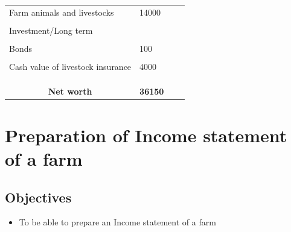 \documentclass[
]{article}
\providecommand{\tightlist}{%
  \setlength{\itemsep}{0pt}\setlength{\parskip}{0pt}}
\begin{document}
\begin{minipage}[c]{\textwidth}
{\begin{minipage}{0.7\textwidth}
\begin{table}[H]
\begin{tabular}[t]{llll}
Farm animals and livestocks & 14000 &  & \\
\cellcolor{gray!6}{Non-current/Fixed total} & \cellcolor{gray!6}{183500} & \cellcolor{gray!6}{Long term total} & \cellcolor{gray!6}{122400}\\
\addlinespace
Investment/Long term &  &  \vphantom{1}& \\
\cellcolor{gray!6}{Stocks} & \cellcolor{gray!6}{1000} & \cellcolor{gray!6}{} & \cellcolor{gray!6}{}\\
Bonds & 100 &  & \\
\cellcolor{gray!6}{Goodwill} & \cellcolor{gray!6}{5000} & \cellcolor{gray!6}{} & \cellcolor{gray!6}{}\\
Cash value of livestock insurance & 4000 &  & \\
\addlinespace
\cellcolor{gray!6}{Investment/Long term total} & \cellcolor{gray!6}{10100} & \cellcolor{gray!6}{} & \cellcolor{gray!6}{}\\
 &  &  & \\
\cellcolor{gray!6}{Total assets} & \cellcolor{gray!6}{216550} & \cellcolor{gray!6}{Total liabilities} & \cellcolor{gray!6}{180400}\\
\multicolumn{1}{c}{\textbf{Net worth}} & \multicolumn{1}{c}{\textbf{36150}} & \multicolumn{1}{c}{\textbf{}} & \multicolumn{1}{c}{\textbf{}}\\
\bottomrule
\end{tabular}
\end{table}

\end{minipage}}
\end{minipage}

\clearpage

\hypertarget{preparation-of-income-statement-of-a-farm}{%
\section{Preparation of Income statement of a farm}\label{preparation-of-income-statement-of-a-farm}}

\hypertarget{objectives-6}{%
\subsection*{Objectives}\label{objectives-6}}

\begin{itemize}
\tightlist
\item
  To be able to prepare an Income statement of a farm
\end{itemize}
\end{document}
